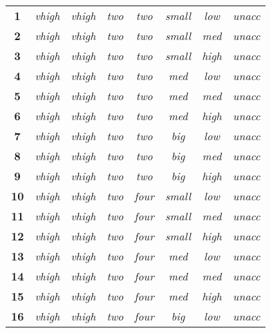 \begin{longtable}[c]{cccccccc}
\textbf{1} & \textit{vhigh} & \textit{vhigh} & \textit{two} & \textit{two} & \textit{small} & \textit{low} & \textit{unacc} \\
\textbf{2} & \textit{vhigh} & \textit{vhigh} & \textit{two} & \textit{two} & \textit{small} & \textit{med} & \textit{unacc} \\
\textbf{3} & \textit{vhigh} & \textit{vhigh} & \textit{two} & \textit{two} & \textit{small} & \textit{high} & \textit{unacc} \\
\textbf{4} & \textit{vhigh} & \textit{vhigh} & \textit{two} & \textit{two} & \textit{med} & \textit{low} & \textit{unacc} \\
\textbf{5} & \textit{vhigh} & \textit{vhigh} & \textit{two} & \textit{two} & \textit{med} & \textit{med} & \textit{unacc} \\
\textbf{6} & \textit{vhigh} & \textit{vhigh} & \textit{two} & \textit{two} & \textit{med} & \textit{high} & \textit{unacc} \\
\textbf{7} & \textit{vhigh} & \textit{vhigh} & \textit{two} & \textit{two} & \textit{big} & \textit{low} & \textit{unacc} \\
\textbf{8} & \textit{vhigh} & \textit{vhigh} & \textit{two} & \textit{two} & \textit{big} & \textit{med} & \textit{unacc} \\
\textbf{9} & \textit{vhigh} & \textit{vhigh} & \textit{two} & \textit{two} & \textit{big} & \textit{high} & \textit{unacc} \\
\textbf{10} & \textit{vhigh} & \textit{vhigh} & \textit{two} & \textit{four} & \textit{small} & \textit{low} & \textit{unacc} \\
\textbf{11} & \textit{vhigh} & \textit{vhigh} & \textit{two} & \textit{four} & \textit{small} & \textit{med} & \textit{unacc} \\
\textbf{12} & \textit{vhigh} & \textit{vhigh} & \textit{two} & \textit{four} & \textit{small} & \textit{high} & \textit{unacc} \\
\textbf{13} & \textit{vhigh} & \textit{vhigh} & \textit{two} & \textit{four} & \textit{med} & \textit{low} & \textit{unacc} \\
\textbf{14} & \textit{vhigh} & \textit{vhigh} & \textit{two} & \textit{four} & \textit{med} & \textit{med} & \textit{unacc} \\
\textbf{15} & \textit{vhigh} & \textit{vhigh} & \textit{two} & \textit{four} & \textit{med} & \textit{high} & \textit{unacc} \\
\textbf{16} & \textit{vhigh} & \textit{vhigh} & \textit{two} & \textit{four} & \textit{big} & \textit{low} & \textit{unacc} \\

\end{longtable}
